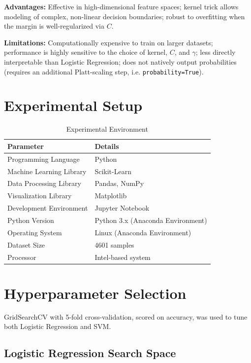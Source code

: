 \documentclass[12pt,a4paper]{article}
\begin{document}
\textbf{Advantages:} Effective in high-dimensional feature spaces; kernel trick allows modeling of complex, non-linear decision boundaries; robust to overfitting when the margin is well-regularized via $C$.

\textbf{Limitations:} Computationally expensive to train on larger datasets; performance is highly sensitive to the choice of kernel, $C$, and $\gamma$; less directly interpretable than Logistic Regression; does not natively output probabilities (requires an additional Platt-scaling step, i.e. \texttt{probability=True}).

\section{Experimental Setup}

\begin{table}[H]
\centering
\begin{tabular}{ll}
\toprule
Parameter & Details \\
\midrule
Programming Language & Python \\
Machine Learning Library & Scikit-Learn \\
Data Processing Library & Pandas, NumPy \\
Visualization Library & Matplotlib \\
Development Environment & Jupyter Notebook \\
Python Version & Python 3.x (Anaconda Environment) \\
Operating System & Linux (Anaconda Environment) \\
Dataset Size & 4601 samples \\
Processor & Intel-based system \\
\bottomrule
\end{tabular}
\caption{Experimental Environment}
\end{table}

\section{Hyperparameter Selection}

GridSearchCV with 5-fold cross-validation, scored on accuracy, was used to tune both Logistic Regression and SVM.

\subsection*{Logistic Regression Search Space}
\end{document}
